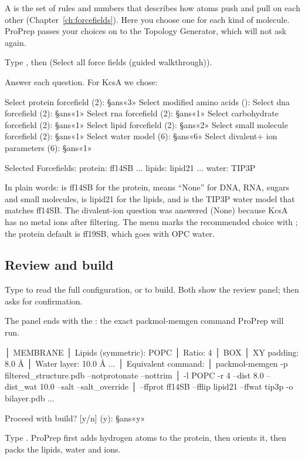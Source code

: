 A  is the set of rules and numbers that describes how atoms
push and pull on each other (Chapter~\ref{ch:forcefields}). Here you choose
one for each kind of molecule. ProPrep passes your choices on to the Topology
Generator, which will not ask again.

\begin{steps}
  \item Type , then  (\textsf{Select all force fields (guided
        walkthrough)}).
  \item Answer each question. For KcsA we chose:
\begin{screen}
Select protein forcefield (2): §ans«3»
Select modified amino acids ():
Select dna forcefield (2): §ans«1»
Select rna forcefield (2): §ans«1»
Select carbohydrate forcefield (2): §ans«1»
Select lipid forcefield (2): §ans«2»
Select small molecule forcefield (2): §ans«1»
Select water model (6): §ans«6»
Select divalent+ ion parameters (6): §ans«1»

Selected Forcefields:
  protein: ff14SB
  ...
  lipids: lipid21
  ...
  water: TIP3P
\end{screen}
\end{steps}

In plain words:  is ff14SB for the protein,  means ``None'' for
DNA, RNA, sugars and small molecules,  is lipid21 for the lipids, and
 is the TIP3P water model that matches ff14SB. The divalent-ion
question was answered  (None) because KcsA has no metal ions after
filtering. The menu marks the recommended choice with ;
the protein default is ff19SB, which goes with OPC water.

\subsection{Review and build}

\begin{steps}
  \item Type  to read the full configuration, or  to build. Both
        show the review panel;  then asks for confirmation.
  \item The panel ends with the : the exact
        packmol-memgen command ProPrep will run.
\begin{screen}
│ MEMBRANE
│   Lipids (symmetric): POPC
│   Ratio:              4
│ BOX
│   XY padding:         8.0 Å
│   Water layer:        10.0 Å
...
│ Equivalent command:
│   packmol-memgen -p filtered_structure.pdb --notprotonate --nottrim
│   -l POPC -r 4 --dist 8.0 --dist_wat 10.0 --salt --salt_override
│   --ffprot ff14SB --fflip lipid21 --ffwat tip3p -o bilayer.pdb ...

Proceed with build? [y/n] (y): §ans«y»
\end{screen}
  \item Type . ProPrep first adds hydrogen atoms to the protein, then
        orients it, then packs the lipids, water and ions.
\end{steps}

